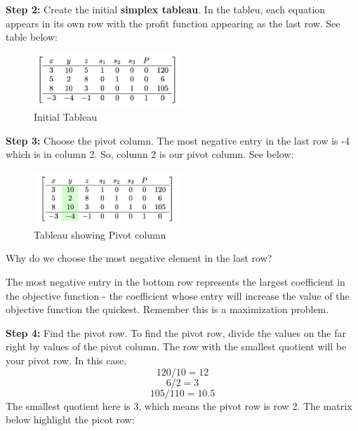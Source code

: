 \documentclass[
  letterpaper,
  DIV=11,
  numbers=noendperiod]{scrreprt}
\begin{document}
\textbf{Step 2:} Create the initial \textbf{simplex tableau}. In the
tableu, each equation appears in its own row with the profit function
appearing as the last row. See table below:

\begin{figure}

{\centering \includegraphics[width=0.5\textwidth,height=\textheight]{images/c.jpeg}

}

\caption{Initial Tableau}

\end{figure}

\textbf{Step 3:} Choose the pivot column. The most negative entry in the
last row is -4 which is in column 2. So, column 2 is our pivot column.
See below:

\begin{figure}

{\centering \includegraphics[width=0.5\textwidth,height=\textheight]{images/d.jpeg}

}

\caption{Tableau showing Pivot column}

\end{figure}

Why do we choose the most negative element in the last row?

The most negative entry in the bottom row represents the largest
coefficient in the objective function - the coefficient whose entry will
increase the value of the objective function the quickest. Remember this
is a maximization problem.

\textbf{Step 4:} Find the pivot row. To find the pivot row, divide the
values on the far right by values of the pivot column. The row with the
smallest quotient will be your pivot row. In this case, \[120/10=12\]
\[6/2=3\] \[105/110=10.5\] The smallest quotient here is 3, which means
the pivot row is row 2. The matrix below highlight the picot row:
\end{document}
